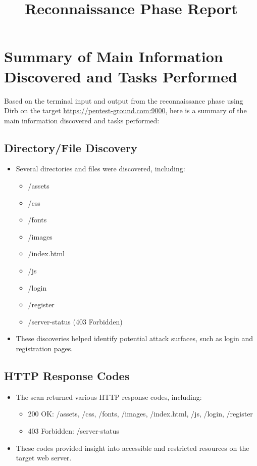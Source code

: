 \documentclass{article}
\title{Reconnaissance Phase Report}
\author{}
\date{}
\begin{document}
\maketitle

\section{Summary of Main Information Discovered and Tasks Performed}

Based on the terminal input and output from the reconnaissance phase using Dirb on the target \url{https://pentest-ground.com:9000}, here is a summary of the main information discovered and tasks performed:

\subsection{Directory/File Discovery}
\begin{itemize}
    \item Several directories and files were discovered, including:
    \begin{itemize}
        \item /assets
        \item /css
        \item /fonts
        \item /images
        \item /index.html
        \item /js
        \item /login
        \item /register
        \item /server-status (403 Forbidden)
    \end{itemize}
    \item These discoveries helped identify potential attack surfaces, such as login and registration pages.
\end{itemize}

\subsection{HTTP Response Codes}
\begin{itemize}
    \item The scan returned various HTTP response codes, including:
    \begin{itemize}
        \item 200 OK: /assets, /css, /fonts, /images, /index.html, /js, /login, /register
        \item 403 Forbidden: /server-status
    \end{itemize}
    \item These codes provided insight into accessible and restricted resources on the target web server.
\end{itemize}
\end{document}
